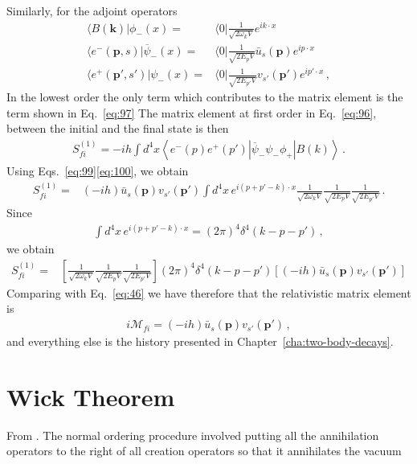 Similarly, for the adjoint operators
\begin{align}
  \label{eq:100}
   \langle B(\mathbf{k})|\phi_-(x)=&\langle0|\frac{1}{\sqrt{2 \omega_k V}}e^{i k\cdot x}\nonumber\\
  \langle e^-(\mathbf{p},s)|\overline{\psi}_-(x)=&\langle0|\frac{1}{\sqrt{2 E_p V}}\bar{u}_s(\mathbf{p})e^{i p\cdot x}\nonumber\\
  \langle e^+(\mathbf{p}',s')|\psi_-(x)=&\langle0|\frac{1}{\sqrt{2 E_{p'} V}}v_{s'}(\mathbf{p}')e^{i p'\cdot x}\,,
\end{align}
In the lowest order the only term which contributes to the matrix element is the term shown in Eq.~\eqref{eq:97}
The matrix element at first order in Eq.~\eqref{eq:96}, between the initial and the final state is then
\begin{align}
  S_{fi}^{(1)}=-i h \int d^4x\left\langle e^-(p)e^+(p')\left|\overline{\psi}_-\psi_-\phi_+\right|B(k)\right\rangle\,.
\end{align}
Using Eqs.~\eqref{eq:99}\eqref{eq:100}, we obtain
\begin{align}
  S_{fi}^{(1)}=&(-i h)\bar{u}_s(\mathbf{p}) v_{s'}(\mathbf{p}')
\int d^4x\,e^{i(p+p'-k)\cdot x}\frac{1}{\sqrt{2\omega_k V}}\frac{1}{\sqrt{2E_p V}}\frac{1}{\sqrt{2E_{p'} V}}\,.
\end{align}
Since
\begin{align}
  \int d^4x\,e^{i(p+p'-k)\cdot x}=(2\pi)^4\delta^4(k-p-p')\,,
\end{align}
we obtain
\begin{align}
  S_{fi}^{(1)}=&\left[\frac{1}{\sqrt{2\omega_k V}}\frac{1}{\sqrt{2E_p V}}\frac{1}{\sqrt{2E_{p'} V}}\right]
(2\pi)^4\delta^4(k-p-p')\left[(-i h)\bar{u}_s(\mathbf{p}) v_{s'}(\mathbf{p}')\right]
\end{align}
Comparing with Eq.~\eqref{eq:46} we have therefore that the relativistic matrix element is
\begin{align}
  i\mathcal{M}_{fi}=(-i h)\bar{u}_s(\mathbf{p}) v_{s'}(\mathbf{p}')\,,
\end{align}
and everything else is the history presented in Chapter~\ref{cha:two-body-decays}. 

\section{Wick Theorem}
\label{sec:wick-theorem}
From \cite{Lahiri:2005sm}. The normal ordering procedure involved putting all the annihilation operators to the right of all creation operators so that it annihilates the vacuum 

